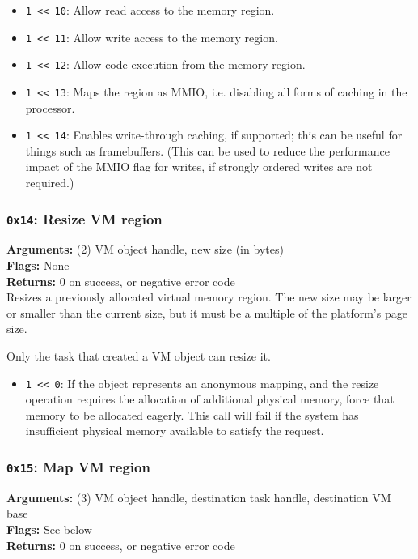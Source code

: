 \documentclass[11pt]{article}
\begin{document}
\begin{itemize}
\item \texttt{1 << 10}: Allow read access to the memory region.
\item \texttt{1 << 11}: Allow write access to the memory region.
\item \texttt{1 << 12}: Allow code execution from the memory region.
\item \texttt{1 << 13}: Maps the region as MMIO, i.e. disabling all forms of caching in the processor.
\item \texttt{1 << 14}: Enables write-through caching, if supported; this can be useful for things such as framebuffers. (This can be used to reduce the performance impact of the MMIO flag for writes, if strongly ordered writes are not required.)
\end{itemize}

\subsubsection{{\tt 0x14}: Resize VM region}
\textbf{Arguments:} (2) VM object handle, new size (in bytes) \\
\textbf{Flags:} None \\
\textbf{Returns:} 0 on success, or negative error code \\

Resizes a previously allocated virtual memory region. The new size may be larger or smaller than the current size, but it must be a multiple of the platform's page size.

Only the task that created a VM object can resize it.

\begin{itemize}
\item \texttt{1 << 0}: If the object represents an anonymous mapping, and the resize operation requires the allocation of additional physical memory, force that memory to be allocated eagerly. This call will fail if the system has insufficient physical memory available to satisfy the request.
\end{itemize}

\subsubsection{{\tt 0x15}: Map VM region}
\textbf{Arguments:} (3) VM object handle, destination task handle, destination VM base \\
\textbf{Flags:} See below \\
\textbf{Returns:} 0 on success, or negative error code \\
\end{document}
